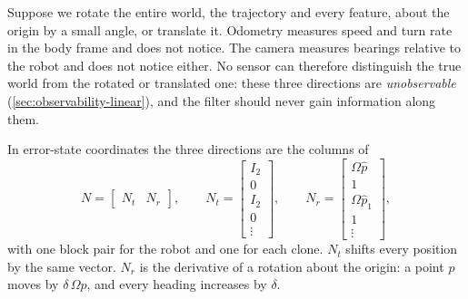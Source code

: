 Suppose we rotate the entire world, the trajectory and every feature, about the origin by a small angle, or translate it. Odometry measures
speed and turn rate in the body frame and does not notice. The camera measures bearings relative to the robot and does not notice either. No
sensor can therefore distinguish the true world from the rotated or translated one: these three directions are \emph{unobservable}
(\cref{sec:observability-linear}), and the filter should never gain information along them.

In error-state coordinates the three directions are the columns of
\begin{equation}
  N = \begin{bmatrix} N_t & N_r \end{bmatrix}, \qquad
  N_t = \begin{bmatrix} I_2 \\ 0 \\ I_2 \\ 0 \\ \vdots \end{bmatrix}, \qquad
  N_r = \begin{bmatrix} \Omega\hat p \\ 1 \\ \Omega\hat p_1 \\ 1 \\ \vdots \end{bmatrix},
  \label{eq:planar-nullspace}
\end{equation}
with one block pair for the robot and one for each clone. $N_t$ shifts every position by the same vector. $N_r$ is the derivative of a rotation
about the origin: a point $p$ moves by $\delta\,\Omega p$, and every heading increases by $\delta$.

